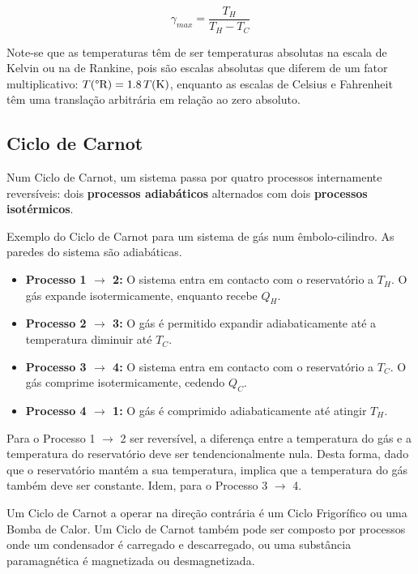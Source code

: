\begin{equation}
    \gamma_{max} = \frac{T_H}{T_H - T_C}
\end{equation}

Note-se que as temperaturas têm de ser temperaturas absolutas na escala de Kelvin ou na de Rankine, pois são escalas absolutas que diferem de um fator multiplicativo: $T(\text{\textdegree R}) = 1.8 \, T(\text{K})$, enquanto as escalas de Celsius e Fahrenheit têm uma translação arbitrária em relação ao zero absoluto.


\subsection{Ciclo de Carnot}

Num Ciclo de Carnot, um sistema passa por quatro processos internamente reversíveis: dois \textbf{processos adiabáticos} alternados com dois \textbf{processos isotérmicos}.

Exemplo do Ciclo de Carnot para um sistema de gás num êmbolo-cilindro. As paredes do sistema são adiabáticas.

\begin{itemize}
    \item \textbf{Processo 1 $\rightarrow$ 2:} O sistema entra em contacto com o reservatório a $T_H$. O gás expande isotermicamente, enquanto recebe $Q_H$.
    \item \textbf{Processo 2 $\rightarrow$ 3:} O gás é permitido expandir adiabaticamente até a temperatura diminuir até $T_C$.
    \item \textbf{Processo 3 $\rightarrow$ 4:} O sistema entra em contacto com o reservatório a $T_C$. O gás comprime isotermicamente, cedendo $Q_C$.
    \item \textbf{Processo 4 $\rightarrow$ 1:} O gás é comprimido adiabaticamente até atingir $T_H$.
\end{itemize}

Para o Processo 1 $\rightarrow$ 2 ser reversível, a diferença entre a temperatura do gás e a temperatura do reservatório deve ser tendencionalmente nula. Desta forma, dado que o reservatório mantém a sua temperatura, implica que a temperatura do gás também deve ser constante. Idem, para o Processo 3 $\rightarrow$ 4.

Um Ciclo de Carnot a operar na direção contrária é um Ciclo Frigorífico ou uma Bomba de Calor. Um Ciclo de Carnot também pode ser composto por processos onde um condensador é carregado e descarregado, ou uma substância paramagnética é magnetizada ou desmagnetizada.

